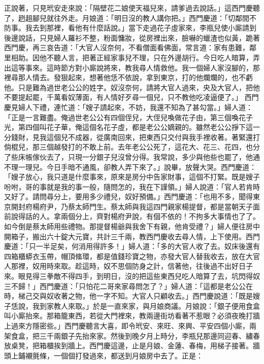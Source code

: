 正說著，只見玳安走來說：「隔壁花二娘使天福兒來，請爹過去說話。」這西門慶聽了，趔趄腳兒就往外走。月娘道：「明日沒的教人講你把。」西門慶道：「切鄰間不防事。我去到那裡，看他有什麼話說。」當下走過花子虛家來，李瓶兒使小廝請到後邊說話，只見婦人羅衫不整，粉面慵妝，從房裡出來，臉嚇的蠟渣也似黃，跪著西門慶，再三哀告道：「大官人沒奈何，不看僧面看佛面，常言道：家有患難，鄰里相助。因他不聽人言，把著正經家事兒不理，只在外邊胡行。今日吃人暗算，弄出這等事來。這時節方對小廝說將來，教我尋人情救他。我一個婦人家沒腳的，那裡尋那人情去。發狠起來，想著他恁不依說，拿到東京，打的他爛爛的，也不虧他。只是難為過世老公公的姓字。奴沒奈何，請將大官人過來，央及大官人，把他不要提起罷，千萬看奴薄面，有人情好歹尋一個兒，只不教他吃凌逼便了。」 西門慶見婦人下禮，連忙道：「嫂子請起來，不妨，我還不知為了甚勾當。」婦人道：「正是一言難盡。俺過世老公公有四個侄兒，大侄兒喚做花子由，第三個喚花子光，第四個叫花子華，俺這個名花子虛，都是老公公嫡親的。雖然老公公掙下這一分錢財，見我這個兒不成器，從廣南回來，把東西只交付與我手裡收著。著緊還打倘棍兒，那三個越發打的不敢上前。去年老公公死了，這花大、花三、花四，也分了些床帳傢伙去了，只現一分銀子兒沒曾分得。我常說，多少與他些也罷了，他通不理一理兒。今日手暗不通風，卻教人弄下來了。」說畢，放聲大哭。西門慶道：「嫂子放心，我只道是什麼事來，原來是房分中告家財事，這個不打緊。既是嫂子吩咐，哥的事就是我的事一般，隨問怎的，我在下謹領。」婦人說道：「官人若肯時又好了。請問尋分上，要用多少禮兒，奴好預備。」西門慶道：「也用不多，聞得東京開封府楊府尹，乃蔡太師門生。蔡太師與我這四門親家楊提督，都是當朝天子面前說得話的人。拿兩個分上，齊對楊府尹說，有個不依的！不拘多大事情也了了。如今倒是蔡太師用些禮物。那提督楊爺與我舍下有親，他肯受禮？」婦人便往房中開箱子，搬出六十錠大元寶，共計三千兩，教西門慶收去尋人情，上下使用。西門慶道：「只一半足矣，何消用得許多！」婦人道：「多的大官人收了去。奴床後還有四箱櫃蟒衣玉帶，帽頂絛環，都是值錢珍寶之物，亦發大官人替我收去，放在大官人那裡，奴用時來取。趁這時，奴不思個防身之計，信著他，往後過不出好日子來。眼見得三拳敵不得四手，到明日，沒的把這些東西兒吃人暗算了去，坑閃得奴三不歸！」西門慶道：「只怕花二哥來家尋問怎了？」婦人道：「這都是老公公在時，梯己交與奴收著之物，他一字不知。大官人只顧收去。」西門慶說道：「既是嫂子恁說，我到家教人來取。」於是一直來家，與月娘商議。月娘說：「銀子便用食盒叫小廝抬來。那箱籠東西，若從大門裡來，教兩邊街坊看著不惹眼？必須夜晚打牆上過來方隱密些。」西門慶聽言大喜，即令玳安、來旺、來興、平安四個小廝，兩架食盒，把三千兩銀子先抬來家。然後到晚夕月上時分，李瓶兒那邊同迎春、繡春放桌凳，把箱櫃挨到牆上。西門慶這邊，止是月娘、金蓮、春梅，用梯子接著。牆頭上鋪襯氈條，一個個打發過來，都送到月娘房中去了。正是：

